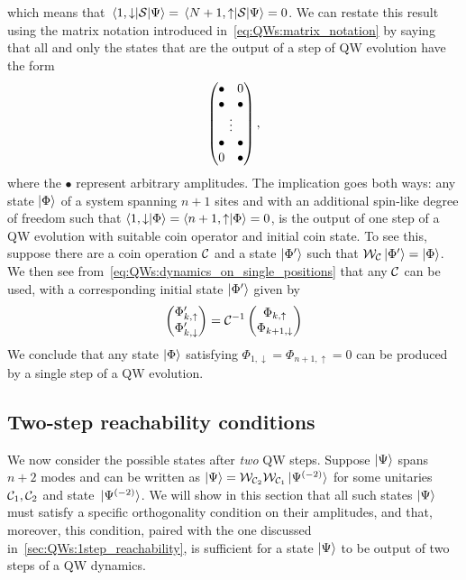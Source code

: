 which means that $\mel{1,\downarrow}{{\mathcal{S}}}{\Psi}=\mel{N+1,\uparrow}{{\mathcal{S}}}{\Psi}=0$.
We can restate this result using the matrix notation introduced in~\cref{eq:QWs:matrix_notation} by saying that all and only the states that are the output of a step of \ac{QW} evolution have the form
\begin{equation}
    \begin{pmatrix}
        \bullet & 0 \\
        \bullet & \bullet \\
        \multicolumn{2}{c}{\vdots} \\ 
        \bullet & \bullet \\
        0 & \bullet \\
    \end{pmatrix},
    \label{eq:QWs:matrix_notation_vanishing_endpoints}
\end{equation}
where the $\bullet$ represent arbitrary amplitudes.
The implication goes both ways: any state $\ket\Phi$ of a system spanning $n+1$ sites and with an additional spin-like degree of freedom such that
$
\braket{1, \downarrow}{\Phi} =
\braket{n+1, \uparrow}{\Phi} = 0
$,
is the output of one step of a QW evolution with suitable coin operator and initial coin state.
To see this, suppose there are a coin operation ${\mathcal{C}}$ and a state $\ket{\Phi'}$ such that ${\mathcal{W}}_{\mathcal{C}}\ket{\Phi'}=\ket{\Phi}$.
We then see from~\cref{eq:QWs:dynamics_on_single_positions} that any ${\mathcal{C}}$ can be used, with a corresponding initial state $\ket{\Phi'}$ given by
\begin{equation}
    \begin{pmatrix}
        \Phi'_{k,\uparrow} \\
        \Phi'_{k,\downarrow}
    \end{pmatrix} = {\mathcal{C}}^{-1}
    \begin{pmatrix}
        \Phi_{k,\uparrow} \\
        \Phi_{k+1,\downarrow}
    \end{pmatrix}
\end{equation}
We conclude that any state $\ket\Phi$ satisfying $\Phi_{1,\downarrow}=\Phi_{n+1,\uparrow}=0$ can be produced by a single step of a QW evolution.

\subsection{Two-step reachability conditions}
\label{sec:QWs:2step_reachability}
We now consider the possible states after \textit{two} \ac{QW} steps.
Suppose $\ket\Psi$ spans $n+2$ modes and can be written as
$\ket\Psi={\mathcal{W}}_{{\mathcal{C}}_2}{\mathcal{W}}_{{\mathcal{C}}_1}\ket*{\Psi^{(-2)}}$
for some unitaries ${\mathcal{C}}_1,{\mathcal{C}}_2$ and state $\ket*{\Psi^{(-2)}}$.
We will show in this section that all such states $\ket\Psi$ must satisfy a specific orthogonality condition on their amplitudes, and that, moreover, this condition, paired with the one discussed in~\cref{sec:QWs:1step_reachability}, is sufficient for a state $\ket\Psi$ to be output of two steps of a \ac{QW} dynamics.


